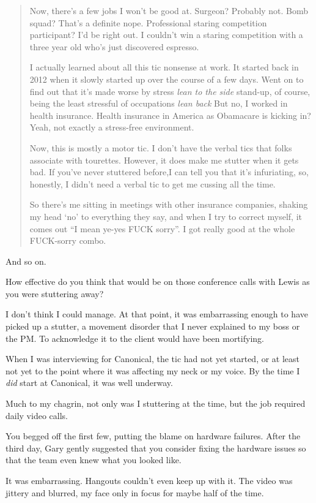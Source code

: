 \begin{paracol}{2}
\begin{leftcolumn}
\begin{quotation}
Now, there's a few jobs I won't be good at. Surgeon? Probably not. Bomb squad? That's a definite nope. Professional staring competition participant? I'd be right out. I couldn't win a staring competition with a three year old who's just discovered espresso.

I actually learned about all this tic nonsense at work. It started back in 2012 when it slowly started up over the course of a few days. Went on to find out that it's made worse by stress \emph{lean to the side} stand-up, of course, being the least stressful of occupations \emph{lean back} But no, I worked in health insurance. Health insurance in America as Obamacare is kicking in? Yeah, not exactly a stress-free environment.

Now, this is mostly a motor tic. I don't have the verbal tics that folks associate with tourettes. However, it does make me stutter when it gets bad. If you've never stuttered before,I can tell you that it's infuriating, so, honestly, I didn't need a verbal tic to get me cussing all the time.

So there's me sitting in meetings with other insurance companies, shaking my head `no' to everything they say, and when I try to correct myself, it comes out ``I mean ye-yes FUCK sorry''. I got really good at the whole FUCK-sorry combo.
\end{quotation}

And so on.

\begin{ally}
How effective do you think that would be on those conference calls with Lewis as you were stuttering away?
\end{ally}
I don't think I could manage. At that point, it was embarrassing enough to have picked up a stutter, a movement disorder that I never explained to my boss or the PM. To acknowledge it to the client would have been mortifying.
\newpage

\noindent When I was interviewing for Canonical, the tic had not yet started, or at least not yet to the point where it was affecting my neck or my voice. By the time I \emph{did} start at Canonical, it was well underway.

Much to my chagrin, not only was I stuttering at the time, but the job required daily video calls.

\begin{ally}
You begged off the first few, putting the blame on hardware failures. After the third day, Gary gently suggested that you consider fixing the hardware issues so that the team even knew what you looked like.
\end{ally}
It was embarrassing. Hangouts couldn't even keep up with it. The video was jittery and blurred, my face only in focus for maybe half of the time.


\end{leftcolumn}
\end{paracol}
